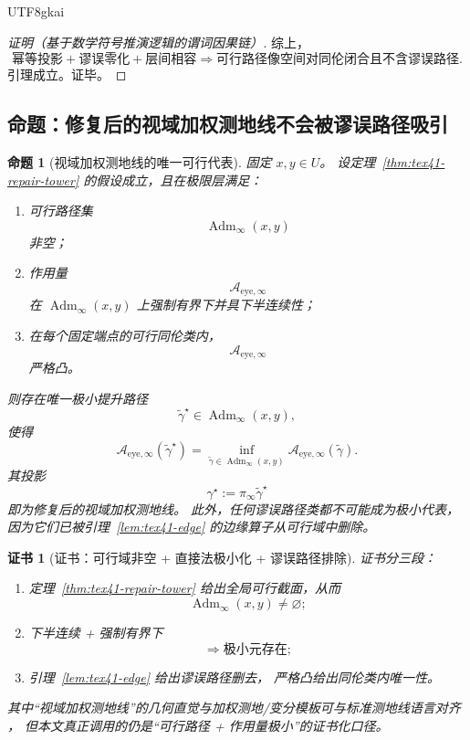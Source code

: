 \documentclass[12pt]{article}
\newtheorem{proposition}{命题}[section]
\newtheorem{Certificate}{证书}[section]
\newcommand{\Adm}{\operatorname{Adm}}
\begin{document}
\begin{CJK*}{UTF8}{gkai}
\begin{proof}[证明（基于数学符号推演逻辑的谓词因果链）]
综上，
\[
  \text{幂等投影}
  +
  \text{谬误零化}
  +
  \text{层间相容}
  \Rightarrow
  \text{可行路径像空间对同伦闭合且不含谬误路径}.
\]
引理成立。证毕。
\end{proof}

\subsection{命题：修复后的视域加权测地线不会被谬误路径吸引}
\label{subsec:tex41-ch1-proposition}

\begin{proposition}[视域加权测地线的唯一可行代表]
\label{prop:tex41-eye-geodesic}
固定 $x,y\in U$。
设定理~\ref{thm:tex41-repair-tower} 的假设成立，且在极限层满足：
\begin{enumerate}
  \item 可行路径集
  \[
    \Adm_\infty(x,y)
  \]
  非空；
  \item 作用量
  \[
    \mathcal A_{\mathrm{eye},\infty}
  \]
  在 $\Adm_\infty(x,y)$ 上强制有界下并具下半连续性；
  \item 在每个固定端点的可行同伦类内，
  \[
    \mathcal A_{\mathrm{eye},\infty}
  \]
  严格凸。
\end{enumerate}
则存在唯一极小提升路径
\[
  \widetilde\gamma^\star\in\Adm_\infty(x,y),
\]
使得
\[
  \mathcal A_{\mathrm{eye},\infty}(\widetilde\gamma^\star)
  =
  \inf_{\widetilde\gamma\in\Adm_\infty(x,y)}
  \mathcal A_{\mathrm{eye},\infty}(\widetilde\gamma).
\]
其投影
\[
  \gamma^\star:=\pi_\infty\widetilde\gamma^\star
\]
即为修复后的视域加权测地线。
此外，任何谬误路径类都不可能成为极小代表，因为它们已被引理~\ref{lem:tex41-edge} 的边缘算子从可行域中删除。
\end{proposition}

\begin{Certificate}[证书：可行域非空 + 直接法极小化 + 谬误路径排除]
\label{cert:tex41-eye-geodesic}
证书分三段：
\begin{enumerate}
  \item 定理~\ref{thm:tex41-repair-tower} 给出全局可行截面，从而
  \[
    \Adm_\infty(x,y)\neq\varnothing;
  \]
  \item 下半连续 + 强制有界下
  \[
    \Rightarrow
    \text{极小元存在};
  \]
  \item 引理~\ref{lem:tex41-edge} 给出谬误路径删去，
  严格凸给出同伦类内唯一性。
\end{enumerate}
其中“视域加权测地线”的几何直觉与加权测地/变分模板可与标准测地线语言对齐
\cite{Lee2018RiemannianManifolds}，
但本文真正调用的仍是“可行路径 + 作用量极小”的证书化口径。
\end{Certificate}


\end{CJK*}
\end{document}
